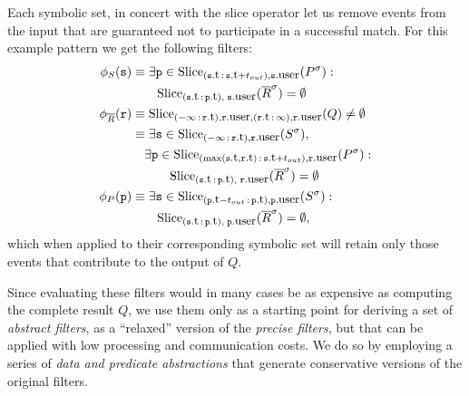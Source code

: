 Each symbolic set, in concert with the slice operator let us remove events from
the input that are guaranteed not to participate in a successful match.
For this example pattern we get the following filters:
\begin{align*}
\precs{S}(\symv{s}) 
&\equiv  
\exists \symv{p} \in 
\slice{\syms{P}}
      {(\facc{\symv{s}}{t}\,:\,\facc{\symv{s}}{t} + t_{out}),
       \facc{\symv{s}}{user}} :\ 
\\
&\qquad
\slice{\syms{\oR}}
      {(\facc{\symv{s}}{t}\,:\,\facc{\symv{p}}{t}),\; \facc{\symv{s}}{user}}
 = \emptyset 
\\
\precs{\oR}(\symv{r}) 
&\equiv
\slice{Q}
      {(-\infty\,:\,\facc{\symv{r}}{t}), 
      	\facc{\symv{r}}{user}, 
       (\facc{\symv{r}}{t}\,:\,\infty), 
       \facc{\symv{r}}{user}} 
\neq \emptyset 
\\
&\equiv
\exists \symv{s} \in 
\slice{\syms{S}}{(-\infty\,:\,\facc{\symv{r}}{t}), \facc{\symv{r}}{user}},
\\
&\quad
\exists \symv{p} \in 
\slice{\syms{P}}
{(\max(\facc{\symv{s}}{t},\facc{\symv{r}}{t})\,:\,\facc{\symv{s}}{t} + t_{out}),
	\facc{\symv{r}}{user}}
: 
\\ 
&\qquad\quad
\slice{\syms{\oR}}
{(\facc{\symv{s}}{t}\,:\,\facc{\symv{p}}{t}),\; \facc{\symv{r}}{user}} 
= \emptyset  
\\
\precs{P}(\symv{p}) 
&\equiv  
\exists \symv{s} \in 
\slice{\syms{S}}
      {(\facc{\symv{p}}{t} - t_{out}\,:\,\facc{\symv{p}}{t}),  
       \facc{\symv{p}}{user}} :\
\\
&\qquad
\slice{\syms{\oR}}
      {(\facc{\symv{s}}{t}\,:\,\facc{\symv{p}}{t}),\; \facc{\symv{p}}{user}}
= \emptyset,
\end{align*}
which when applied to their corresponding symbolic set will retain only those 
events that contribute to the output of $Q$. 

Since evaluating these filters would in many cases be as expensive as computing
the complete result $Q$, we use them only as a starting point for deriving a set
of {\em abstract filters}, as a ``relaxed'' version of the 
{\em precise filters}, but that can be applied with low processing and 
communication costs.
We do so by employing a series of {\em data and predicate abstractions} 
that generate conservative versions of the original filters.



